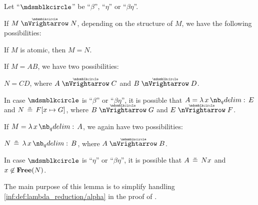 \begin{lemma}\label{thm:parallel_reduction_deconstruction}
  Let \enquote{\( {\Anon} \)} be \enquote{\( \beta \)}, \enquote{\( \eta \)} or \enquote{\( \beta\eta \)}.

  If \( M \ppred N \), depending on the structure of \( M \), we have the following possibilities:
  \begin{thmenum}
     If \( M \) is atomic, then \( M = N \).

     If \( M = AB \), we have two possibilities:
    \begin{thmenum}
       \( N = CD \), where \( A \ppred C \) and \( B \ppred D \).

       In case \( {\Anon} \) is \enquote{\( \beta \)} or \enquote{\( \beta\eta \)}, it is possible that \( A = \qabs x E \) and \( N \aequiv F[x \mapsto G] \), where \( B \ppred G \) and \( E \ppred F \).
    \end{thmenum}

     If \( M = \qabs x A \), we again have two possibilities:
    \begin{thmenum}
       \( N \aequiv \qabs x B \), where \( A \ppred B \).

       In case \( {\Anon} \) is \enquote{\( \eta \)} or \enquote{\( \beta\eta \)}, it is possible that \( A \aequiv Nx \) and \( x \not\in \op*{Free}(N) \).
    \end{thmenum}
  \end{thmenum}
\end{lemma}
\begin{comments}
  \item The main purpose of this lemma is to simplify handling \ref{inf:def:lambda_reduction/alpha} in the proof of .
\end{comments}
